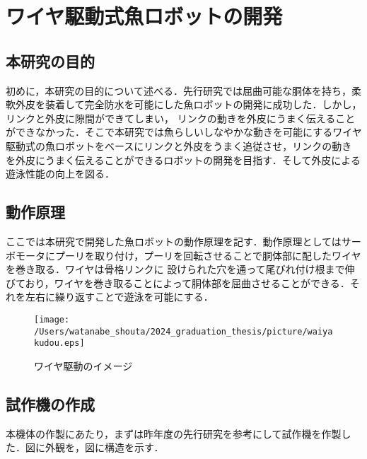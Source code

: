 \newpage
\section{ワイヤ駆動式魚ロボットの開発}
\subsection{本研究の目的}
初めに，本研究の目的について述べる．先行研究では屈曲可能な胴体を持ち，柔軟外皮を装着して完全防水を可能にした魚ロボットの開発に成功した．しかし，リンクと外皮に隙間ができてしまい，
リンクの動きを外皮にうまく伝えることができなかった．そこで本研究では魚らしいしなやかな動きを可能にするワイヤ駆動式の魚ロボットをベースにリンクと外皮をうまく追従させ，リンクの動き
を外皮にうまく伝えることができるロボットの開発を目指す．そして外皮による遊泳性能の向上を図る．

\subsection{動作原理}
ここでは本研究で開発した魚ロボットの動作原理を記す．動作原理としてはサーボモータにプーリを取り付け，プーリを回転させることで胴体部に配したワイヤを巻き取る．ワイヤは骨格リンクに
設けられた穴を通って尾びれ付け根まで伸びており，ワイヤを巻き取ることによって胴体部を屈曲させることができる．それを左右に繰り返すことで遊泳を可能にする．

 \begin{figure}[htbp]
    \centering
    \texttt{[image: /Users/watanabe\_shouta/2024\_graduation\_thesis/picture/waiyakudou.eps]}
    \caption{ワイヤ駆動のイメージ}
    \label{fig:waiyakudou}
 \end{figure}

 \subsection{試作機の作成}
 本機体の作製にあたり，まずは昨年度の先行研究を参考にして試作機を作製した．図に外観を，図に構造を示す．